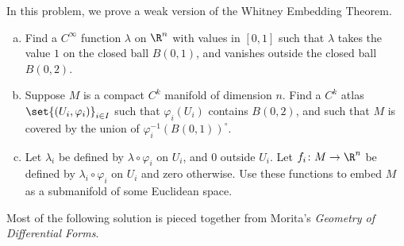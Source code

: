 \documentclass[10pt]{mypackage}
\begin{document}
\begin{problem}[Problem 5]
  In this problem, we prove a weak version of the Whitney Embedding Theorem.
  \begin{enumerate}[(a)]
    \item Find a $C^{\infty}$ function $\lambda$ on $\R^{n}$ with values in $[0,1]$ such that $\lambda$ takes the value $1$ on the closed ball $B\left( 0,1 \right)$, and vanishes outside the closed ball $B\left( 0,2 \right)$.
    \item Suppose $M$ is a compact $C^{k}$ manifold of dimension $n$. Find a $C^{k}$ atlas $\set{\left( U_i,\varphi_i \right)}_{i\in I}$ such that $\varphi_i\left( U_i \right)$ contains $B\left( 0,2 \right)$, and such that $M$ is covered by the union of $\varphi_i^{-1}\left( B\left( 0,1 \right) \right)^{\circ}$.
    \item Let $\lambda_i$ be defined by $\lambda\circ\varphi_i$ on $U_i$, and $0$ outside $U_i$. Let $f_i\colon M\rightarrow \R^n$ be defined by $\lambda_i\circ\varphi_i$ on $U_i$ and zero otherwise. Use these functions to embed $M$ as a submanifold of some Euclidean space.
  \end{enumerate}
\end{problem}
\begin{remark}
  Most of the following solution is pieced together from Morita's \textit{Geometry of Differential Forms}.
\end{remark}
\end{document}
